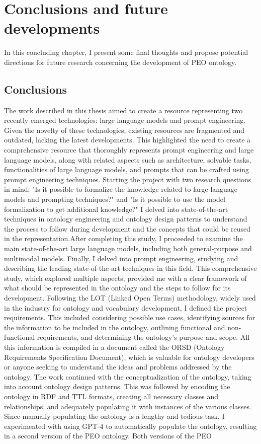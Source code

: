 \chapter{Conclusions and future developments}
\label{chapter:6_conclusions_future_developments}
In this concluding chapter, I present some final thoughts and propose potential directions for future research concerning the development of PEO ontology.


\section{Conclusions}
\label{section:6_1_conclusions}
The work described in this thesis aimed to create a resource representing two recently emerged technologies: large language models and prompt engineering. Given the novelty of these technologies, existing resources are fragmented and outdated, lacking the latest developments. This highlighted the need to create a comprehensive resource that thoroughly represents prompt engineering and large language models, along with related aspects such as architecture, solvable tasks, functionalities of large language models, and prompts that can be crafted using prompt engineering techniques. Starting the project with two research questions in mind: "Is it possible to formalize the knowledge related to large language models and prompting techniques?" and "Is it possible to use the model formalization to get additional knowledge?" I delved into state-of-the-art techniques in ontology engineering and ontology design patterns to understand the process to follow during development and the concepts that could be reused in the representation.After completing this study, I proceeded to examine the main state-of-the-art large language models, including both general-purpose and multimodal models. Finally, I delved into prompt engineering, studying and describing the leading state-of-the-art techniques in this field. This comprehensive study, which explored multiple aspects, provided me with a clear framework of what should be represented in the ontology and the steps to follow for its development. Following the LOT (Linked Open Terms) methodology, widely used in the industry for ontology and vocabulary development, I defined the project requirements. This included considering possible use cases, identifying sources for the information to be included in the ontology, outlining functional and non-functional requirements, and determining the ontology's purpose and scope. All this information is compiled in a document called the ORSD (Ontology Requirements Specification Document), which is valuable for ontology developers or anyone seeking to understand the ideas and problems addressed by the ontology. The work continued with the conceptualization of the ontology, taking into account ontology design patterns. This was followed by encoding the ontology in RDF and TTL formats, creating all necessary classes and relationships, and adequately populating it with instances of the various classes. Since manually populating the ontology is a lengthy and tedious task, I experimented with using GPT-4 to automatically populate the ontology, resulting in a second version of the PEO ontology. Both versions of the PEO 